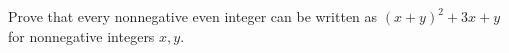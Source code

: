 Prove that every nonnegative even integer can be written as $(x+y)^2+3x+y $ for nonnegative integers $ x,y $.
